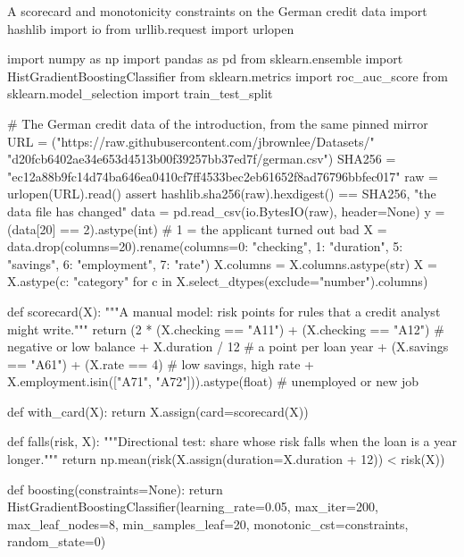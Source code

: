 \begin{pylisting}[label={lst:knowledge}]{A scorecard and monotonicity constraints on the German credit data}
import hashlib
import io
from urllib.request import urlopen

import numpy as np
import pandas as pd
from sklearn.ensemble import HistGradientBoostingClassifier
from sklearn.metrics import roc_auc_score
from sklearn.model_selection import train_test_split

# The German credit data of the introduction, from the same pinned mirror
URL = ("https://raw.githubusercontent.com/jbrownlee/Datasets/"
       "d20fcb6402ae34e653d4513b00f39257bb37ed7f/german.csv")
SHA256 = "ec12a88b9fc14d74ba646ea0410cf7ff4533bec2eb61652f8ad76796bbfec017"
raw = urlopen(URL).read()
assert hashlib.sha256(raw).hexdigest() == SHA256, "the data file has changed"
data = pd.read_csv(io.BytesIO(raw), header=None)
y = (data[20] == 2).astype(int)                       # 1 = the applicant turned out bad
X = data.drop(columns=20).rename(columns={0: "checking", 1: "duration", 5: "savings",
                                          6: "employment", 7: "rate"})
X.columns = X.columns.astype(str)
X = X.astype({c: "category" for c in X.select_dtypes(exclude="number").columns})

def scorecard(X):
    """A manual model: risk points for rules that a credit analyst might write."""
    return (2 * (X.checking == "A11") + (X.checking == "A12")  # negative or low balance
            + X.duration / 12                                  # a point per loan year
            + (X.savings == "A61") + (X.rate == 4)             # low savings, high rate
            + X.employment.isin(["A71", "A72"])).astype(float) # unemployed or new job

def with_card(X):
    return X.assign(card=scorecard(X))

def falls(risk, X):
    """Directional test: share whose risk falls when the loan is a year longer."""
    return np.mean(risk(X.assign(duration=X.duration + 12)) < risk(X))

def boosting(constraints=None):
    return HistGradientBoostingClassifier(learning_rate=0.05, max_iter=200,
                                          max_leaf_nodes=8, min_samples_leaf=20,
                                          monotonic_cst=constraints, random_state=0)


\end{pylisting}

